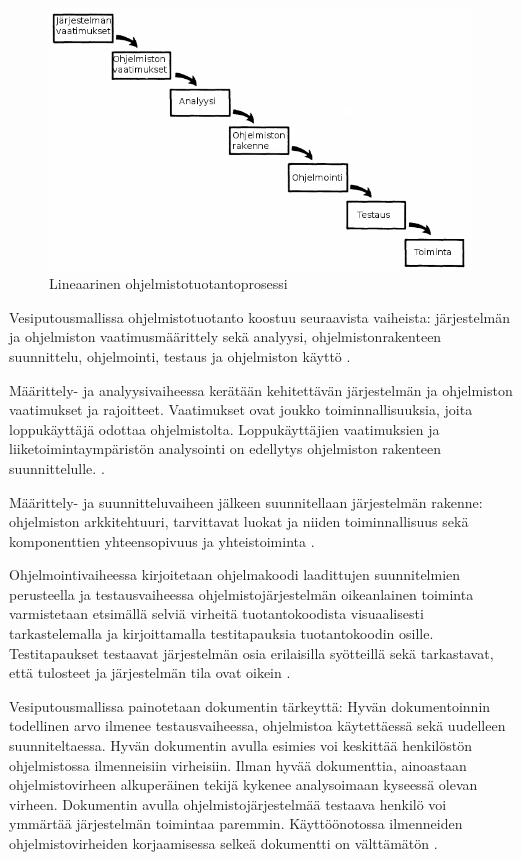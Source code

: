 \documentclass[finnish]{tktltiki2}
\theoremstyle{definition}
\theoremstyle{remark}
\begin{document}
\begin{figure}[h!]
\caption{Lineaarinen ohjelmistotuotantoprosessi}
\centering
\includegraphics[width=\textwidth]{waterfall}
\end{figure}

Vesiputousmallissa ohjelmistotuotanto koostuu seuraavista vaiheista: järjestelmän ja ohjelmiston vaatimusmäärittely sekä analyysi, ohjelmistonrakenteen suunnittelu, ohjelmointi, testaus ja ohjelmiston käyttö \cite{ROY70}.

Määrittely- ja analyysivaiheessa kerätään kehitettävän järjestelmän ja ohjelmiston vaatimukset ja rajoitteet. Vaatimukset ovat joukko toiminnallisuuksia, joita loppukäyttäjä odottaa ohjelmistolta. Loppukäyttäjien vaatimuksien ja liiketoimintaympäristön analysointi on edellytys ohjelmiston rakenteen suunnittelulle. \cite{ROY70}.

Määrittely- ja suunnitteluvaiheen jälkeen suunnitellaan järjestelmän rakenne: ohjelmiston arkkitehtuuri, tarvittavat luokat ja niiden toiminnallisuus sekä komponenttien yhteensopivuus ja yhteistoiminta \cite{ROY70}.

Ohjelmointivaiheessa kirjoitetaan ohjelmakoodi laadittujen suunnitelmien perusteella ja testausvaiheessa ohjelmistojärjestelmän oikeanlainen toiminta varmistetaan etsimällä selviä virheitä tuotantokoodista visuaalisesti tarkastelemalla ja kirjoittamalla testitapauksia tuotantokoodin osille. Testitapaukset testaavat järjestelmän osia erilaisilla syötteillä sekä tarkastavat, että tulosteet ja järjestelmän tila ovat oikein  \cite{ROY70}.

Vesiputousmallissa painotetaan dokumentin tärkeyttä: Hyvän dokumentoinnin todellinen arvo ilmenee testausvaiheessa, ohjelmistoa käytettäessä sekä uudelleen suunniteltaessa. Hyvän dokumentin avulla esimies voi keskittää henkilöstön ohjelmistossa ilmenneisiin virheisiin. Ilman hyvää dokumenttia, ainoastaan ohjelmistovirheen alkuperäinen tekijä kykenee analysoimaan kyseessä olevan virheen. Dokumentin avulla ohjelmistojärjestelmää testaava henkilö voi ymmärtää järjestelmän toimintaa paremmin. Käyttöönotossa ilmenneiden ohjelmistovirheiden korjaamisessa selkeä dokumentti on välttä\-mätön \cite{ROY70}.
\end{document}
